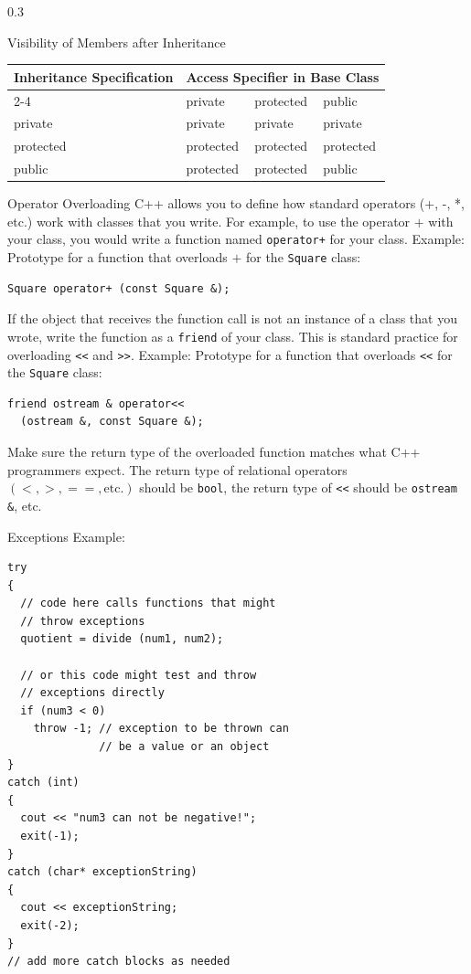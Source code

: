 \documentclass[final]{beamer}
\begin{document}
\begin{frame}[t,fragile]
\begin{columns}[t,totalwidth=0.95\paperwidth, colsep=0.05\paperwidth]
\begin{column}{0.3\paperwidth}
\begin{block}{Visibility of Members after Inheritance}
\begin{tabular}{|l|l|l|l|}
\hline
\multirow{2}{*}{Inheritance Specification} & \multicolumn{3}{c|}{Access Specifier in Base Class} \\
\cline{2-4}
 & private & protected & public \\
\hline
private & private & private & private \\
\hline
protected & protected & protected & protected \\
\hline
public & protected & protected & public \\
\hline
\end{tabular}
\end{block}

\begin{block}{Operator Overloading}
C++ allows you to define how standard operators (+, -, *, etc.) work with classes that you write. For example, to use the operator $+$ with your class, you would write a function named \texttt{operator+} for your class.
Example:
Prototype for a function that overloads $+$ for the \texttt{Square} class:
\begin{lstlisting}
Square operator+ (const Square &);
\end{lstlisting}
If the object that receives the function call is not an instance of a class that you wrote, write the function as a \texttt{friend} of your class. This is standard practice for overloading \texttt{<<} and \texttt{>>}.
Example:
Prototype for a function that overloads \texttt{<<} for the \texttt{Square} class:
\begin{lstlisting}
friend ostream & operator<<
  (ostream &, const Square &);
\end{lstlisting}
Make sure the return type of the overloaded function matches what C++ programmers expect. The return type of relational operators $(<, >, ==, \text{etc.})$ should be \texttt{bool}, the return type of \texttt{<<} should be \texttt{ostream \&}, etc.
\end{block}

\begin{block}{Exceptions}
Example:
\begin{lstlisting}
try
{
  // code here calls functions that might
  // throw exceptions
  quotient = divide (num1, num2);

  // or this code might test and throw
  // exceptions directly
  if (num3 < 0)
    throw -1; // exception to be thrown can
              // be a value or an object
}
catch (int)
{
  cout << "num3 can not be negative!";
  exit(-1);
}
catch (char* exceptionString)
{
  cout << exceptionString;
  exit(-2);
}
// add more catch blocks as needed
\end{lstlisting}
\end{block}


\end{column}
\end{columns}
\end{frame}
\end{document}
